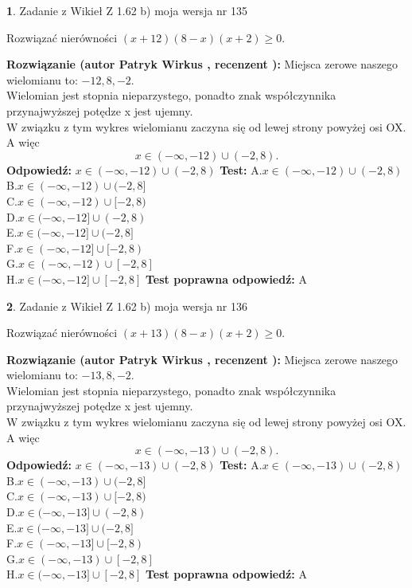 \documentclass[12pt, a4paper]{article}
\theoremstyle{definition} %
\newtheorem{zad}{}
\newcommand{\zadStart}[1]{\begin{zad}#1\newline}
\newcommand{\zadStop}{\end{zad}}
\newcommand{\rozwStart}[2]{\noindent \textbf{Rozwiązanie (autor #1 , recenzent #2): }\newline}
\newcommand{\rozwStop}{\newline}
\newcommand{\odpStart}{\noindent \textbf{Odpowiedź:}\newline}
\newcommand{\odpStop}{\newline}
\newcommand{\testStart}{\noindent \textbf{Test:}\newline}
\newcommand{\testStop}{\newline}
\newcommand{\kluczStart}{\noindent \textbf{Test poprawna odpowiedź:}\newline}
\newcommand{\kluczStop}{\newline}
\begin{document}
\zadStart{Zadanie z Wikieł Z 1.62 b) moja wersja nr 135}

Rozwiązać nierówności $(x+12)(8-x)(x+2)\ge0$.
\zadStop
\rozwStart{Patryk Wirkus}{}
Miejsca zerowe naszego wielomianu to: $-12, 8, -2$.\\
Wielomian jest stopnia nieparzystego, ponadto znak współczynnika przy\linebreak najwyższej potędze x jest ujemny.\\ W związku z tym wykres wielomianu zaczyna się od lewej strony powyżej osi OX. A więc $$x \in (-\infty,-12) \cup (-2,8).$$
\rozwStop
\odpStart
$x \in (-\infty,-12) \cup (-2,8)$
\odpStop
\testStart
A.$x \in (-\infty,-12) \cup (-2,8)$\\
B.$x \in (-\infty,-12) \cup (-2,8]$\\
C.$x \in (-\infty,-12) \cup [-2,8)$\\
D.$x \in (-\infty,-12] \cup (-2,8)$\\
E.$x \in (-\infty,-12] \cup (-2,8]$\\
F.$x \in (-\infty,-12] \cup [-2,8)$\\
G.$x \in (-\infty,-12) \cup [-2,8]$\\
H.$x \in (-\infty,-12] \cup [-2,8]$
\testStop
\kluczStart
A
\kluczStop



\zadStart{Zadanie z Wikieł Z 1.62 b) moja wersja nr 136}

Rozwiązać nierówności $(x+13)(8-x)(x+2)\ge0$.
\zadStop
\rozwStart{Patryk Wirkus}{}
Miejsca zerowe naszego wielomianu to: $-13, 8, -2$.\\
Wielomian jest stopnia nieparzystego, ponadto znak współczynnika przy\linebreak najwyższej potędze x jest ujemny.\\ W związku z tym wykres wielomianu zaczyna się od lewej strony powyżej osi OX. A więc $$x \in (-\infty,-13) \cup (-2,8).$$
\rozwStop
\odpStart
$x \in (-\infty,-13) \cup (-2,8)$
\odpStop
\testStart
A.$x \in (-\infty,-13) \cup (-2,8)$\\
B.$x \in (-\infty,-13) \cup (-2,8]$\\
C.$x \in (-\infty,-13) \cup [-2,8)$\\
D.$x \in (-\infty,-13] \cup (-2,8)$\\
E.$x \in (-\infty,-13] \cup (-2,8]$\\
F.$x \in (-\infty,-13] \cup [-2,8)$\\
G.$x \in (-\infty,-13) \cup [-2,8]$\\
H.$x \in (-\infty,-13] \cup [-2,8]$
\testStop
\kluczStart
A
\kluczStop
\end{document}
